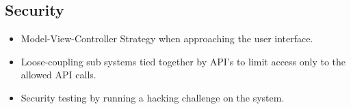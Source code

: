 	\subsection{Security}
		\begin{itemize}
			\item Model-View-Controller Strategy when approaching the user interface.
			\item Loose-coupling sub systems tied together by API's to limit access only to the allowed API calls.
			\item Security testing by running a hacking challenge on the system.
		\end{itemize}